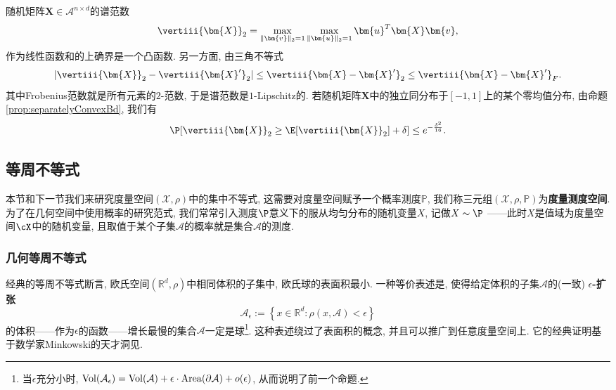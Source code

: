 \begin{example}[随机矩阵的谱范数]
	随机矩阵$\bm{X} \in \mathcal{A}^{n \times d}$的谱范数
	\begin{equation*}
		\vertiii{\bm{X}}_2 = \max_{\|\bm{v}\|_2 = 1} \max_{\|\bm{u}\|_2 = 1} \bm{u}^T \bm{X} \bm{v}, 
	\end{equation*}
	作为线性函数和的上确界是一个凸函数. 
	另一方面, 由三角不等式
	\begin{equation*}
		|\vertiii{\bm{X}}_2 - \vertiii{\bm{X}'}_2|
		\leq \vertiii{\bm{X} - \bm{X}'}_2
		\leq \vertiii{\bm{X} - \bm{X}'}_F. 
	\end{equation*}
	其中Frobenius范数就是所有元素的$2$-范数, 于是谱范数是$1$-Lipschitz的. 
	若随机矩阵$\bm{X}$中的独立同分布于$[-1,1]$上的某个零均值分布, 由命题\ref{prop:separatelyConvexBd}, 我们有
	\begin{equation*}
		\P[ \vertiii{\bm{X}}_2 \geq \E[\vertiii{\bm{X}}_2] + \delta]
		\leq e^{-\frac{\delta^2}{16}}. 
	\end{equation*}
\end{example}


\subsection{等周不等式}

本节和下一节我们来研究度量空间$(\mathcal{X}, \rho)$中的集中不等式, 这需要对度量空间赋予一个概率测度$\mathbb{P}$, 我们称三元组$(\mathcal{X}, \rho, \mathbb{P})$为\textbf{度量测度空间}. 
为了在几何空间中使用概率的研究范式, 我们常常引入测度$\P$意义下的服从均匀分布的随机变量$X$, 记做$X \sim \P$ ——此时$X$是值域为度量空间$\cX$中的随机变量, 且取值于某个子集$\mathcal{A}$的概率就是集合$\mathcal{A}$的测度. 


\subsubsection{几何等周不等式}
经典的等周不等式断言, 欧氏空间$(\mathbb{R}^d, \rho)$中相同体积的子集中, 欧氏球的表面积最小. 
一种等价表述是, 使得给定体积的子集$\mathcal{A}$的(一致) \textbf{$\epsilon$-扩张}
\begin{equation*}
	\mathcal{A}_{\epsilon} := \left\{ x \in \mathbb{R}^d \colon \rho(x, \mathcal{A}) < \epsilon \right\}
\end{equation*}
的体积——作为$\epsilon$的函数——增长最慢的集合$\mathcal{A}$一定是球\footnote{当$\epsilon$充分小时, $\operatorname{Vol}(\mathcal{A}_{\epsilon}) = \operatorname{Vol}(\mathcal{A}) + \epsilon \cdot \operatorname{Area}(\partial \mathcal{A}) + o(\epsilon)$, 从而说明了前一个命题.}. 
这种表述绕过了表面积的概念, 并且可以推广到任意度量空间上. 
它的经典证明基于数学家Minkowski的天才洞见. 


